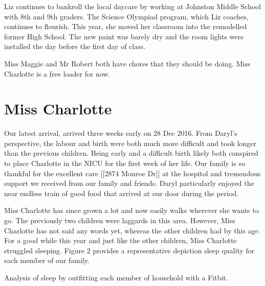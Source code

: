 \documentclass[letterpaper,11pt]{article}
\makeatletter
\newenvironment{figurehere}
  {\def\@captype{figure}}
  {}
\makeatother
\begin{document}
\begin{multicols}{2}
Liz continues to bankroll the local daycare by working at Johnston Middle School
with 8th and 9th graders.
The Science Olympiad program, which Liz coaches, continues to flourish. 
This year, she moved her classroom into the remodelled former High School.  The
new paint was barely dry and the room lights were installed the day before the
first day of class.

Miss Maggie and Mr Robert both have chores that they should be doing.  Miss
Charlotte is a free loader for now.

\section{Miss Charlotte}

Our latest arrival, arrived three weeks early on 28 Dec 2016.  From Daryl's
perspective, the labour and birth were both much more difficult and took longer
than the previous children.  Being early and a difficult birth likely both
conspired to place Charlotte in the NICU for the first week of her life.  Our
family is so thankful for the excellent care [[2874 Monroe Dr]] at the hospitol
and tremendous support we received from our family and friends.  Daryl particularly enjoyed the
near endless train of good food that arrived at our door during the period.

Miss Charlotte has since grown a lot and now easily walks wherever she wants to
go. The previously two children were laggards in this area.  However,
Miss Charlotte has not said any words yet, whereas the other children had by
this age.  For a good while this year and just like the other children, Miss
Charlotte struggled sleeping. Figure 2 provides a representative depiction sleep
quality for each member of our family.

\bigskip

\begin{figurehere}
 \centering   
 \caption{Analysis of sleep by outfitting each member of household with a
 Fitbit.}
\end{figurehere}


\end{multicols}
\end{document}
